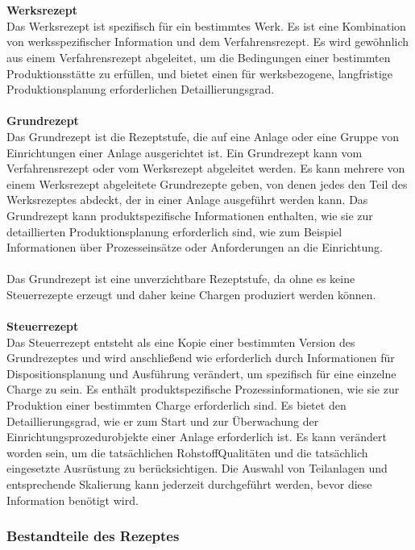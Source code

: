 \\\\
\textbf{Werksrezept}\\
Das Werksrezept ist spezifisch für ein bestimmtes Werk. Es ist eine Kombination von werksspezifischer Information und dem Verfahrensrezept. Es wird gewöhnlich aus einem Verfahrensrezept abgeleitet, um die Bedingungen einer bestimmten Produktionsstätte zu erfüllen, und bietet einen für werksbezogene, langfristige Produktionsplanung erforderlichen Detaillierungsgrad.
\\\\
\textbf{Grundrezept}\\
Das Grundrezept ist die Rezeptstufe, die auf eine Anlage oder eine Gruppe von Einrichtungen einer Anlage ausgerichtet ist. Ein Grundrezept kann vom Verfahrensrezept oder vom Werksrezept abgeleitet werden. Es kann mehrere von einem Werksrezept abgeleitete Grundrezepte geben, von denen jedes den Teil des Werksrezeptes abdeckt, der in einer Anlage ausgeführt werden kann. Das Grundrezept kann produktspezifische Informationen enthalten, wie sie zur detaillierten Produktionsplanung erforderlich sind, wie zum Beispiel Informationen über Prozesseinsätze oder Anforderungen an die Einrichtung.\\\\
Das Grundrezept ist eine unverzichtbare Rezeptstufe, da ohne es keine Steuerrezepte erzeugt und daher keine Chargen produziert werden können.
\\\\
\textbf{Steuerrezept}\\
Das Steuerrezept entsteht als eine Kopie einer bestimmten Version des Grundrezeptes und wird anschließend wie erforderlich durch Informationen für Dispositionsplanung und Ausführung verändert, um spezifisch für eine einzelne Charge zu sein. Es enthält produktspezifische Prozessinformationen, wie sie zur Produktion einer bestimmten Charge erforderlich sind. Es bietet den Detaillierungsgrad, wie er zum Start und zur Überwachung der Einrichtungsprozedurobjekte einer Anlage erforderlich ist. Es kann verändert worden sein, um die tatsächlichen RohstoffQualitäten und die tatsächlich eingesetzte Ausrüstung zu berücksichtigen. Die Auswahl von Teilanlagen und entsprechende Skalierung kann jederzeit durchgeführt werden, bevor diese Information benötigt wird.
\subsubsection{Bestandteile des Rezeptes}

